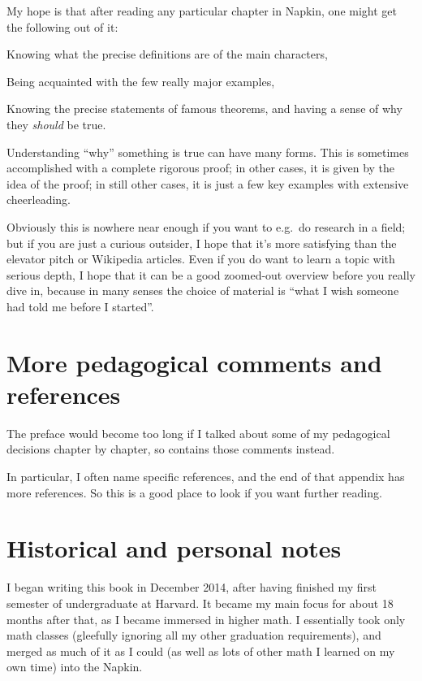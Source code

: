 My hope is that after reading any particular chapter in Napkin,
one might get the following out of it:
\begin{itemize}
	\ii Knowing what the precise definitions are of the main characters,

	\ii Being acquainted with the few really major examples,

	\ii Knowing the precise statements of famous theorems,
	and having a sense of why they \emph{should} be true.
\end{itemize}
Understanding ``why'' something is true can have many forms.
This is sometimes accomplished with a complete rigorous proof;
in other cases, it is given by the idea of the proof;
in still other cases, it is just a few key examples
with extensive cheerleading.

Obviously this is nowhere near enough if you want to e.g.\ do research in a field;
but if you are just a curious outsider,
I hope that it's more satisfying than the elevator pitch or Wikipedia articles.
Even if you do want to learn a topic with serious depth,
I hope that it can be a good zoomed-out overview before you really dive in,
because in many senses the choice of material is
``what I wish someone had told me before I started''.


\section*{More pedagogical comments and references}
The preface would become too long if I talked about
some of my pedagogical decisions chapter by chapter,
so  contains those comments instead.

In particular, I often name specific references,
and the end of that appendix has more references.
So this is a good place to look if you want further reading.

\section*{Historical and personal notes}
I began writing this book in December 2014,
after having finished my first semester of undergraduate at Harvard.
It became my main focus for about 18 months after that,
as I became immersed in higher math.
I essentially took only math classes
(gleefully ignoring all my other graduation requirements),
and merged as much of it as I could
(as well as lots of other math I learned on my own time)
into the Napkin.

